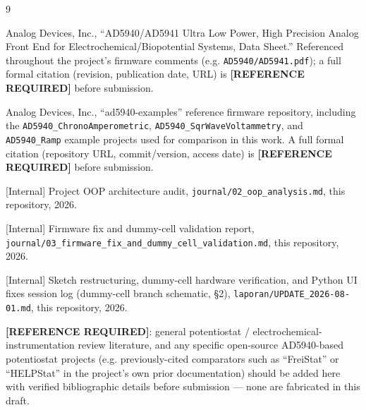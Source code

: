 \documentclass[preprint,12pt]{elsarticle}
\begin{document}
\begin{thebibliography}{9}

Analog Devices, Inc., ``AD5940/AD5941 Ultra Low Power, High Precision Analog Front End for Electrochemical/Biopotential Systems, Data Sheet.'' Referenced throughout the project's firmware comments (e.g. \texttt{AD5940/AD5941.pdf}); a full formal citation (revision, publication date, URL) is \textbf{[REFERENCE REQUIRED]} before submission.

Analog Devices, Inc., ``ad5940-examples'' reference firmware repository, including the \texttt{AD5940\_ChronoAmperometric}, \texttt{AD5940\_SqrWaveVoltammetry}, and \texttt{AD5940\_Ramp} example projects used for comparison in this work. A full formal citation (repository URL, commit/version, access date) is \textbf{[REFERENCE REQUIRED]} before submission.

[Internal] Project OOP architecture audit, \texttt{journal/02\_oop\_analysis.md}, this repository, 2026.

[Internal] Firmware fix and dummy-cell validation report, \texttt{journal/03\_firmware\_fix\_and\_dummy\_cell\_validation.md}, this repository, 2026.

[Internal] Sketch restructuring, dummy-cell hardware verification, and Python UI fixes session log (dummy-cell branch schematic, \S2), \texttt{laporan/UPDATE\_2026-08-01.md}, this repository, 2026.

\textbf{[REFERENCE REQUIRED]}: general potentiostat / electrochemical-instrumentation review literature, and any specific open-source AD5940-based potentiostat projects (e.g. previously-cited comparators such as ``FreiStat'' or ``HELPStat'' in the project's own prior documentation) should be added here with verified bibliographic details before submission --- none are fabricated in this draft.

\end{thebibliography}
\end{document}
